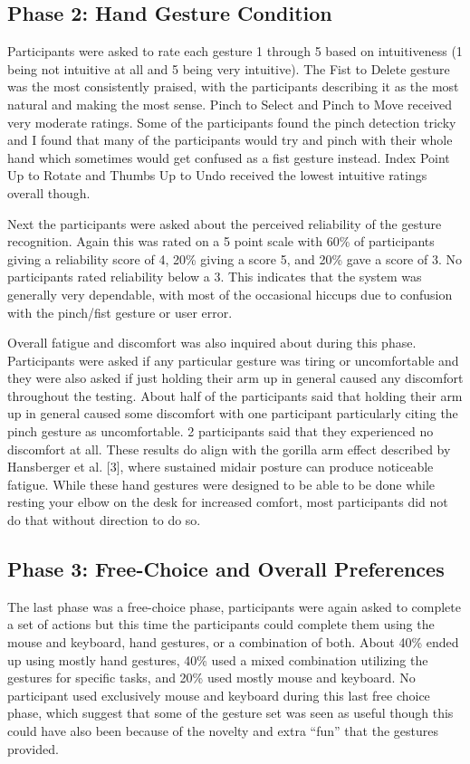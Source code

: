 \documentclass[manuscript]{acmart}
\begin{document}
\subsection{Phase 2: Hand Gesture Condition}

Participants were asked to rate each gesture 1 through 5 based on intuitiveness (1 being not intuitive at all and 5 being very intuitive). The Fist to Delete gesture was the most consistently praised, with the participants describing it as the most natural and making the most sense. Pinch to Select and Pinch to Move received very moderate ratings. Some of the participants found the pinch detection tricky and I found that many of the participants would try and pinch with their whole hand which sometimes would get confused as a fist gesture instead. Index Point Up to Rotate and Thumbs Up to Undo received the lowest intuitive ratings overall though.

Next the participants were asked about the perceived reliability of the gesture recognition. Again this was rated on a 5 point scale with 60\% of participants giving a reliability score of 4, 20\% giving a score 5, and 20\% gave a score of 3. No participants rated reliability below a 3. This indicates that the system was generally very dependable, with most of the occasional hiccups due to confusion with the pinch/fist gesture or user error.

Overall fatigue and discomfort was also inquired about during this phase. Participants were asked if any particular gesture was tiring or uncomfortable and they were also asked if just holding their arm up in general caused any discomfort throughout the testing. About half of the participants said that holding their arm up in general caused some discomfort with one participant particularly citing the pinch gesture as uncomfortable. 2 participants said that they experienced no discomfort at all. These results do align with the gorilla arm effect described by Hansberger et al. [3], where sustained midair posture can produce noticeable fatigue. While these hand gestures were designed to be able to be done while resting your elbow on the desk for increased comfort, most participants did not do that without direction to do so.

\subsection{Phase 3: Free-Choice and Overall Preferences}

The last phase was a free-choice phase, participants were again asked to complete a set of actions but this time the participants could complete them using the mouse and keyboard, hand gestures, or a combination of both. About 40\% ended up using mostly hand gestures, 40\% used a mixed combination utilizing the gestures for specific tasks, and 20\% used mostly mouse and keyboard. No participant used exclusively mouse and keyboard during this last free choice phase, which suggest that some of the gesture set was seen as useful though this could have also been because of the novelty and extra “fun” that the gestures provided.
\end{document}
